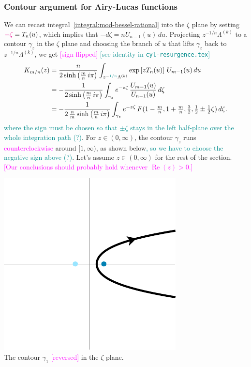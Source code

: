 \documentclass{article}
\theoremstyle{definition}
\begin{document}
\subsubsection{Contour argument for Airy-Lucas functions}\label{contour-argument-AL}
We can recast integral~\ref{integral:mod-bessel-rational} into the $\zeta$ plane by setting $\textcolor{magenta}{-\zeta} = T_n(u)$, which implies that $-d\zeta = n U_{n-1}(u)\,du$. Projecting $z^{-1/n} \Lambda^{(k)}$ to a contour $\gamma_z$ in the $\zeta$ plane and choosing the branch of $u$ that lifts $\gamma_z$ back to $z^{-1/n} \Lambda^{(k)}$, we get \textcolor{magenta}{[sign flipped]} \textcolor{DarkCyan}{[see identity in \texttt{cyl-resurgence.tex}]}
\begin{align*}%
K_{m/n}(z) & = \frac{n}{2 \sinh\big(\tfrac{m}{n}\,i\pi\big)} \int_{z^{-\textcolor{DarkCyan}{1/n}}\Lambda^{(k)}} \exp\left[z T_n(u)\right]\,U_{m-1}(u)\,du \\
& = -\frac{1}{2 \sinh\big(\tfrac{m}{n}\,i\pi\big)} \int_{\gamma_z} e^{-z\zeta}\,\frac{U_{m-1}(u)}{U_{n-1}(u)}\,d\zeta \\
& = -\frac{1}{2\,\tfrac{n}{m} \sinh\big(\tfrac{m}{n}\,i\pi\big)} \int_{\gamma_z} e^{-z\zeta}\,F(1 - \tfrac{m}{n}, 1 + \tfrac{m}{n}, \tfrac{3}{2}, \tfrac{1}{2} \pm \tfrac{1}{2}\zeta)\,d\zeta.
\end{align*}
\textcolor{DarkCyan}{where the sign must be chosen so that $\pm\zeta$ stays in the left half-plane over the whole integration path (?)}.
For $z \in (0, \infty)$, the contour $\gamma_z$ runs \textcolor{magenta}{counterclockwise} around $[1, \infty)$, as shown below\textcolor{DarkCyan}{, so we have to choose the negative sign above (?)}. Let's assume $z \in (0, \infty)$ for the rest of the section. \textcolor{magenta}{[Our conclusions should probably hold whenever $\operatorname{Re}(z) > 0$.]}
\begin{center}
\includegraphics{figures/zeta_contour_3.pdf} \\[1em]
{\small The contour $\gamma_1$ \textcolor{magenta}{[reversed]} in the $\zeta$ plane.}
\end{center}
\end{document}

